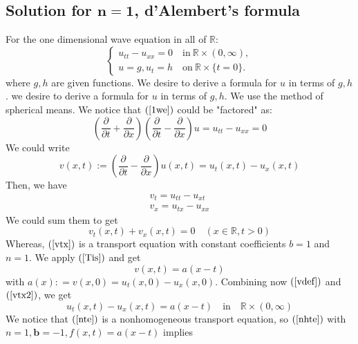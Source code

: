 \documentclass[10pt]{article}
\def\rr{{\mathbb R}}
\begin{document}
\subsection{Solution for $\mathbf{n=1}$, d'Alembert's formula}
For the one dimensional wave equation in all of $\rr$:
\begin{equation}
\label{1we}
    \begin{cases}
        u_{tt} - u_{xx} = 0 \quad \text{in} \ \rr\times (0,\infty),\\
        u = g, u_t = h \quad \text{on} \ \rr\times \{t=0\}.
    \end{cases}
\end{equation}
where $g,h$ are given functions. We desire to derive a formula for $u$ in terms of $g,h$. we desire to derive a formula for $u$ in terms of $g,h$. We use the method of spherical means. We notice that $(\ref{1we})$ could be "factored" as:
\begin{equation}
    \label{factored}
    \left(\frac{\partial}{\partial t}+\frac{\partial}{\partial x}\right)\left(\frac{\partial}{\partial t}-\frac{\partial}{\partial x}\right) u = u_{tt} - u_{xx} = 0
\end{equation}
We could write
\begin{equation}
    \label{vdef}
    v(x,t) := \left(\frac{\partial}{\partial t}-\frac{\partial}{\partial x}\right) u(x,t) = u_t(x,t) - u_x(x,t)
\end{equation}
Then, we have
\begin{align*}
    v_t = u_{tt} - u_{xt}\\
    v_x = u_{tx} - u_{xx}
\end{align*}
We could sum them to get
\begin{equation}
    \label{vtx}
    v_t(x,t) + v_x(x,t) = 0 \quad (x \in \rr, t>0)
\end{equation}
Whereas, $(\ref{vtx})$ is a transport equation with constant coefficients $b = 1$ and $n = 1$. We apply $(\ref{Tis})$ and get
\begin{equation}
    \label{vtx2}
    v(x,t) = a(x-t)
\end{equation}
with $a(x): = v(x,0) = u_t(x,0) - u_x(x,0)$. Combining now $(\ref{vdef})$ and $(\ref{vtx2})$, we get
\begin{equation}
    \label{nte}
    u_t(x,t) - u_x(x,t) = a(x-t) \quad \text{in} \quad \rr \times (0,\infty)
\end{equation}
We notice that $(\ref{nte})$ is a nonhomogeneous transport equation, so $(\ref{nhte})$ with $n = 1, \mathbf{b} = -1, f(x,t) = a(x-t)$ implies
\end{document}
